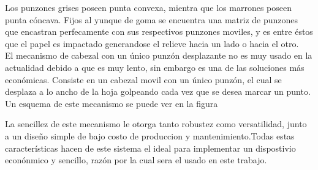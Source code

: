 Los punzones grises poseen punta convexa, mientra que los marrones poseen
punta c\'oncava. Fijos al yunque de goma se encuentra una matriz de punzones
que encastran perfecamente con sus respectivos punzones moviles, y es entre
\'estos que el papel es impactado generandose el relieve hacia un lado o hacia
el otro. \\

El mecanismo de cabezal con un \'unico punz\'on desplazante no es muy usado
en la actualidad debido a que es muy lento, sin embargo es una de las
soluciones m\'as econ\'omicas. Consiste en un cabezal movil con un \'unico
punz\'on, el cual se desplaza a lo ancho de la hoja golpeando cada vez que se
desea marcar un punto. Un esquema de este mecanismo se puede ver en la figura 

%
%

La sencillez de este mecanismo le otorga tanto robustez como versatilidad,
junto a un dise\~no simple de bajo costo de produccion y mantenimiento.Todas
estas caracter\'isticas hacen de este sistema el ideal para implementar un
dispostivio econ\'onmico y sencillo, raz\'on por la cual sera el usado en
este trabajo.